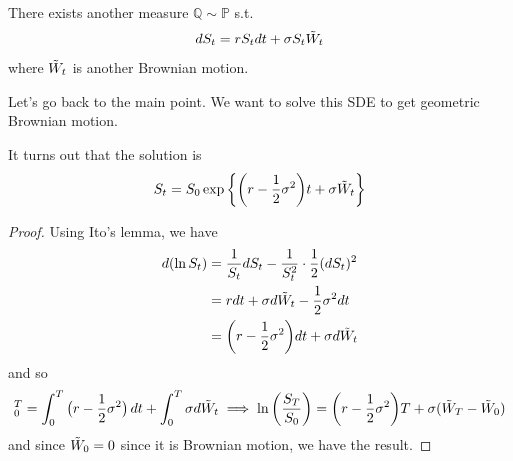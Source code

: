 \documentclass{article}
\begin{document}
    \begin{theorem}
      \label{thm:girsanov-theorem}
      There exists another measure $\mathbb{Q} \sim \mathbb{P}$ s.t. 
      \begin{equation}
        dS_t = r S_t dt + \sigma S_t \Tilde{W}_t 
      \end{equation}
      where $\Tilde{W}_t$ is another Brownian motion. 
    \end{theorem}

    Let's go back to the main point. We want to solve this SDE to get geometric Brownian motion. 

    \begin{theorem}
      \label{thm:solution-to-sde}
      It turns out that the solution is 
      \begin{equation}
        S_t = S_0 \exp \bigg\{ \bigg( r - \frac{1}{2} \sigma^2 \bigg) t + \sigma \Tilde{W}_t \bigg\}
      \end{equation}
    \end{theorem}
    \begin{proof}
      Using Ito's lemma, we have 
      \begin{align}
        d (\ln S_t) & = \frac{1}{S_t} dS_t - \frac{1}{S_t^2} \cdot \frac{1}{2} (d S_t)^2 \\ 
                    & = r dt + \sigma d \Tilde{W}_t - \frac{1}{2} \sigma^2 dt \\
                    & = \bigg( r - \frac{1}{2} \sigma^2 \bigg) dt + \sigma d \Tilde{W}_t
      \end{align}
      and so 
      \begin{equation}
        [ \ln S_T ]_0^T = \int_0^T \big( r - \frac{1}{2} \sigma^2 \big) \,dt + \int_0^T \sigma d\Tilde{W}_t \implies \ln \bigg( \frac{S_T}{S_0} \bigg) = \bigg( r - \frac{1}{2} \sigma^2 \bigg) T + \sigma (\Tilde{W}_T - \Tilde{W}_0)
      \end{equation}
      and since $\Tilde{W}_0 = 0$ since it is Brownian motion, we have the result. 
    \end{proof}
\end{document}
